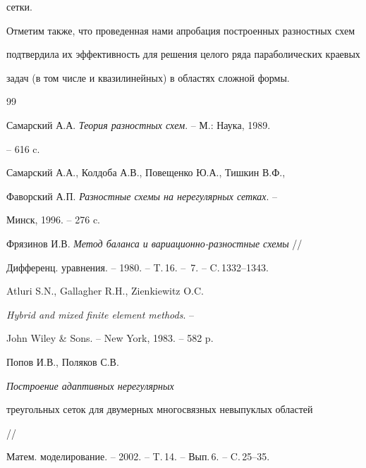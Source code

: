 сетки.





Отметим также, что проведенная нами апробация построенных разностных схем


подтвердила их эффективность для решения целого ряда параболических краевых


задач (в том числе и квазилинейных) в областях сложной формы.





\begin{thebibliography}{99}







Самарский А.А. {\em Теория разностных схем}. -- М.: Наука, 1989.


-- 616 c.




Самарский А.А., Колдоба А.В., Повещенко Ю.А., Тишкин В.Ф.,


Фаворский А.П. {\em Разностные схемы на нерегулярных сетках}. --


Минск, 1996. -- 276 c.




Фрязинов И.В. {\em Метод баланса и вариационно-разностные схемы} //


Дифференц. уравнения. -- 1980. -- T.\,16. -- \No\,7. -- C.\,1332--1343.




Atluri S.N., Gallagher R.H., Zienkiewitz O.C.


{\em Hybrid and mixed finite element methods}. --


John Wiley \& Sons. -- New York, 1983. -- 582 p.




Попов И.В., Поляков С.В. {\em Построение адаптивных нерегулярных


треугольных сеток для двумерных многосвязных невыпуклых областей} //


Матем. моделирование. -- 2002. -- T.\,14. -- Вып.\,6. -- C.\,25--35.





\end{thebibliography}





\vskip 0.5cm












\label{end}






